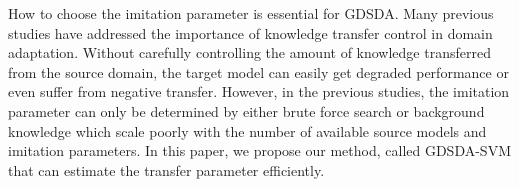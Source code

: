 How to choose the imitation parameter is essential for GDSDA.
Many previous studies have addressed the importance of knowledge transfer control in domain adaptation\cite{duan2012learning,duan2012visual}. Without carefully controlling the amount of knowledge transferred from the source domain, the target model can easily get degraded performance or even suffer from negative transfer\cite{pan2010survey}. However, in the previous studies, the imitation parameter can only be determined by either brute force search\cite{lopez2015unifying} or background knowledge\cite{Tzeng_2015_ICCV} which scale poorly with the number of available source models and imitation parameters.
In this paper, we propose our method, called GDSDA-SVM that can estimate the transfer parameter efficiently.



